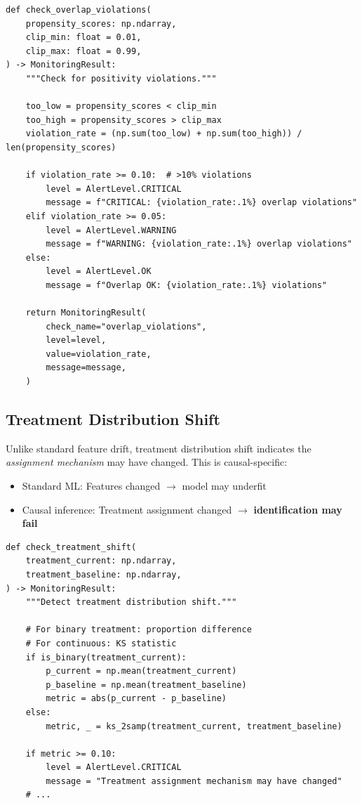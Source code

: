 \begin{verbatim}
def check_overlap_violations(
    propensity_scores: np.ndarray,
    clip_min: float = 0.01,
    clip_max: float = 0.99,
) -> MonitoringResult:
    """Check for positivity violations."""

    too_low = propensity_scores < clip_min
    too_high = propensity_scores > clip_max
    violation_rate = (np.sum(too_low) + np.sum(too_high)) / len(propensity_scores)

    if violation_rate >= 0.10:  # >10% violations
        level = AlertLevel.CRITICAL
        message = f"CRITICAL: {violation_rate:.1%} overlap violations"
    elif violation_rate >= 0.05:
        level = AlertLevel.WARNING
        message = f"WARNING: {violation_rate:.1%} overlap violations"
    else:
        level = AlertLevel.OK
        message = f"Overlap OK: {violation_rate:.1%} violations"

    return MonitoringResult(
        check_name="overlap_violations",
        level=level,
        value=violation_rate,
        message=message,
    )
\end{verbatim}

\subsection{Treatment Distribution Shift}

Unlike standard feature drift, treatment distribution shift indicates the \textit{assignment mechanism} may have changed. This is causal-specific:

\begin{itemize}
    \item Standard ML: Features changed $\rightarrow$ model may underfit
    \item Causal inference: Treatment assignment changed $\rightarrow$ \textbf{identification may fail}
\end{itemize}

\begin{verbatim}
def check_treatment_shift(
    treatment_current: np.ndarray,
    treatment_baseline: np.ndarray,
) -> MonitoringResult:
    """Detect treatment distribution shift."""

    # For binary treatment: proportion difference
    # For continuous: KS statistic
    if is_binary(treatment_current):
        p_current = np.mean(treatment_current)
        p_baseline = np.mean(treatment_baseline)
        metric = abs(p_current - p_baseline)
    else:
        metric, _ = ks_2samp(treatment_current, treatment_baseline)

    if metric >= 0.10:
        level = AlertLevel.CRITICAL
        message = "Treatment assignment mechanism may have changed"
    # ...
\end{verbatim}

